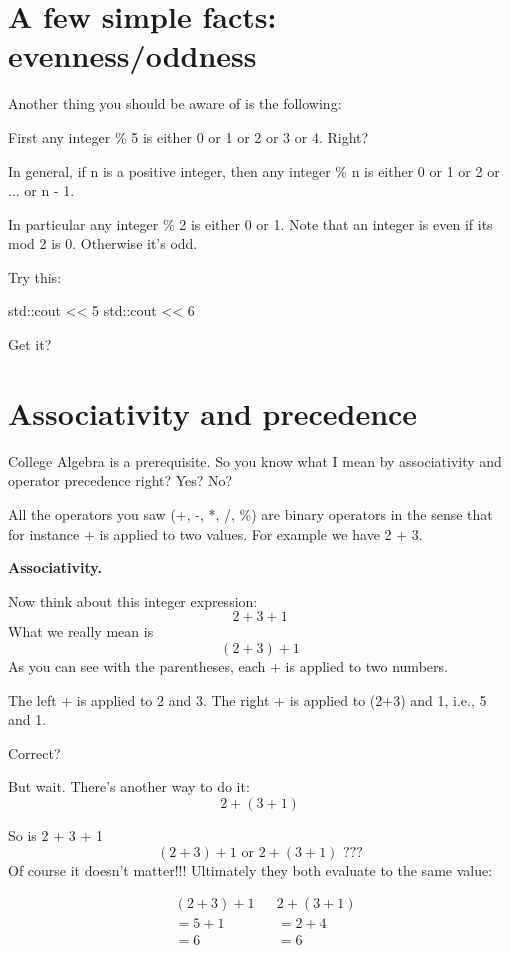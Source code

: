 %

\newpage\section{A few simple facts: evenness/oddness}

Another thing you should be aware of is the following:

First any integer \% 5 is either 0 or 1 or 2 or 3 or 4. Right?

In general, if n is a positive integer, then any integer \% n is either 0 or 1
or 2 or ... or n - 1.

In particular any integer \% 2 is either 0 or 1. Note that an integer is even
if its mod 2 is 0. Otherwise it's odd.

Try this:
\begin{console}
std::cout << 5 %
std::cout << 6 %
\end{console}

Get it?

\newpage\section{Associativity and precedence}



College Algebra is a prerequisite. So you know what I mean by
associativity and operator precedence right? Yes? No?


All the operators you saw (+, -, *, /, \%) are binary operators in the sense
that for instance + is applied to two values. For example we have 2 + 3.


\textbf{Associativity.}

Now think about this integer expression:
\[2+3+1\]
What we really mean is
\[(2 + 3) + 1\]
As you can see with the parentheses, each + is applied to two numbers.
\begin{console}
\li The left + is applied to 2 and 3.
\li The right + is applied to (2+3) and 1, i.e., 5 and 1.
\end{console}
Correct?


But wait. There's another way to do it:
\[2 + (3 + 1)\]

So is 2 + 3 + 1
\[(2 + 3) + 1 \text{     or     } 2 + (3 + 1)\text{    ???}\]
Of course it doesn't matter!!! Ultimately they both evaluate to the same value:

\begin{align*}
&(2 + 3) + 1 & & 2 + (3 + 1)\\
&=5+1 & & =2+4\\
&=6 & & =6
\end{align*}

